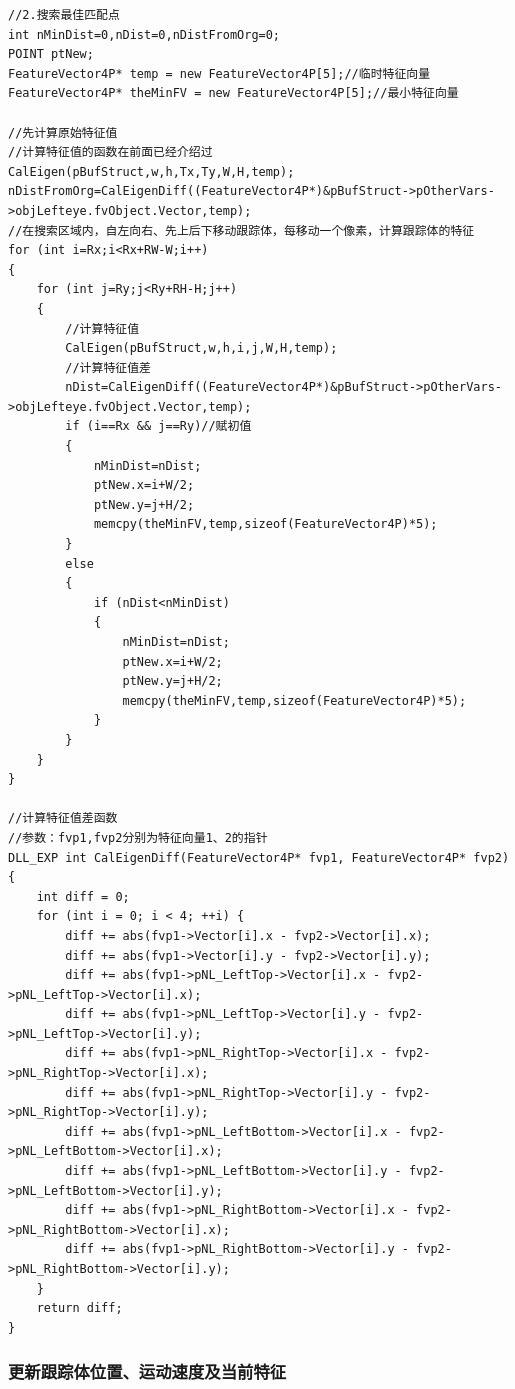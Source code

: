 \documentclass[12pt,hyperref,a4paper,UTF8]{ctexart}
\begin{document}
        \begin{lstlisting}[caption={搜索最佳匹配点}, label={lst:example}]
//2.搜索最佳匹配点
int nMinDist=0,nDist=0,nDistFromOrg=0;
POINT ptNew;
FeatureVector4P* temp = new FeatureVector4P[5];//临时特征向量
FeatureVector4P* theMinFV = new FeatureVector4P[5];//最小特征向量

//先计算原始特征值
//计算特征值的函数在前面已经介绍过
CalEigen(pBufStruct,w,h,Tx,Ty,W,H,temp);
nDistFromOrg=CalEigenDiff((FeatureVector4P*)&pBufStruct->pOtherVars->objLefteye.fvObject.Vector,temp);
//在搜索区域内，自左向右、先上后下移动跟踪体，每移动一个像素，计算跟踪体的特征
for (int i=Rx;i<Rx+RW-W;i++)
{
    for (int j=Ry;j<Ry+RH-H;j++)
    {
        //计算特征值
        CalEigen(pBufStruct,w,h,i,j,W,H,temp);
        //计算特征值差
        nDist=CalEigenDiff((FeatureVector4P*)&pBufStruct->pOtherVars->objLefteye.fvObject.Vector,temp);
        if (i==Rx && j==Ry)//赋初值
        {
            nMinDist=nDist;
            ptNew.x=i+W/2;
            ptNew.y=j+H/2;
            memcpy(theMinFV,temp,sizeof(FeatureVector4P)*5);
        }
        else
        {
            if (nDist<nMinDist)
            {
                nMinDist=nDist;
                ptNew.x=i+W/2;
                ptNew.y=j+H/2;
                memcpy(theMinFV,temp,sizeof(FeatureVector4P)*5);
            }
        }
    }
}

//计算特征值差函数
//参数：fvp1,fvp2分别为特征向量1、2的指针
DLL_EXP int CalEigenDiff(FeatureVector4P* fvp1, FeatureVector4P* fvp2) {
	int diff = 0;
	for (int i = 0; i < 4; ++i) {
		diff += abs(fvp1->Vector[i].x - fvp2->Vector[i].x);
		diff += abs(fvp1->Vector[i].y - fvp2->Vector[i].y);
		diff += abs(fvp1->pNL_LeftTop->Vector[i].x - fvp2->pNL_LeftTop->Vector[i].x);
		diff += abs(fvp1->pNL_LeftTop->Vector[i].y - fvp2->pNL_LeftTop->Vector[i].y);
		diff += abs(fvp1->pNL_RightTop->Vector[i].x - fvp2->pNL_RightTop->Vector[i].x);
		diff += abs(fvp1->pNL_RightTop->Vector[i].y - fvp2->pNL_RightTop->Vector[i].y);
		diff += abs(fvp1->pNL_LeftBottom->Vector[i].x - fvp2->pNL_LeftBottom->Vector[i].x);
		diff += abs(fvp1->pNL_LeftBottom->Vector[i].y - fvp2->pNL_LeftBottom->Vector[i].y);
		diff += abs(fvp1->pNL_RightBottom->Vector[i].x - fvp2->pNL_RightBottom->Vector[i].x);
		diff += abs(fvp1->pNL_RightBottom->Vector[i].y - fvp2->pNL_RightBottom->Vector[i].y);
	}
	return diff;
}

        \end{lstlisting}




        \subsubsection*{\large \textbf{更新跟踪体位置、运动速度及当前特征}}
\end{document}
